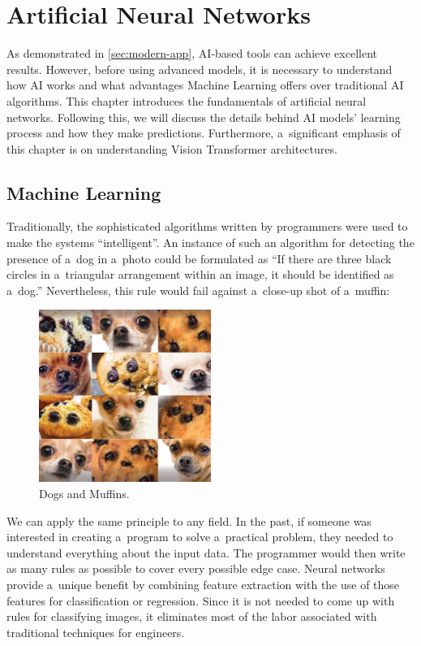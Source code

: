 \chapter{Artificial Neural Networks}
\label{chapter:ann}

As demonstrated in \autoref{sec:modern-app}, AI‑based tools can achieve excellent results. However, before using advanced models, it is necessary to understand how AI works and what advantages Machine Learning offers over traditional AI algorithms. This chapter introduces the fundamentals of artificial neural networks. Following this, we will discuss the details behind AI models' learning process and how they make predictions. Furthermore, a~significant emphasis of this chapter is on understanding Vision Transformer architectures.

\section{Machine Learning}

Traditionally, the sophisticated algorithms written by programmers were used to make the systems \enquote{intelligent}. An instance of such an algorithm for detecting the presence of a~dog in a~photo could be formulated as \enquote{If there are three black circles in a~triangular arrangement within an image, it should be identified as a~dog.} Nevertheless, this rule would fail against a~close-up shot of a~muffin:

\begin{figure}[htbp]
    \centering
    \includegraphics[width=0.5\textwidth]{obrazky-figures/02-theoretical-basis/muffin.jpg}
    \caption{Dogs and Muffins.}
    \label{fig:muffin}
\end{figure}

We can apply the same principle to any field. In the past, if someone was interested in creating a~program to solve a~practical problem, they needed to understand everything about the input data. The programmer would then write as many rules as possible to cover every possible edge case. Neural networks provide a~unique benefit by combining feature extraction with the use of those features for classification or regression. Since it is not needed to come up with rules for classifying images, it eliminates most of the labor associated with traditional techniques for engineers.

